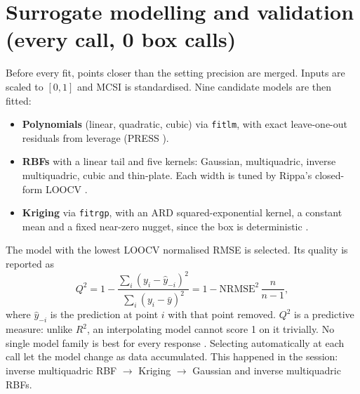 \documentclass[11pt,a4paper]{article}
\newcommand{\Qsq}{Q^2}
\begin{document}
\section{Surrogate modelling and validation (every call, 0 box calls)}
Before every fit, points closer than the setting precision are merged.
Inputs are scaled to $[0,1]$ and MCSI is standardised.
Nine candidate models are then fitted:
\begin{itemize}
\setlength{\itemsep}{0pt}
\item \textbf{Polynomials} (linear, quadratic, cubic) via \texttt{fitlm}, with exact leave-one-out residuals from leverage (PRESS \cite{Allen1971}).
\item \textbf{RBFs} with a linear tail and five kernels: Gaussian, multiquadric, inverse multiquadric, cubic and thin-plate. Each width is tuned by Rippa's closed-form LOOCV \cite{Rippa1999}.
\item \textbf{Kriging} via \texttt{fitrgp}, with an ARD squared-exponential kernel, a constant mean and a fixed near-zero nugget, since the box is deterministic \cite{Sacks1989,Rasmussen2006}.
\end{itemize}
The model with the lowest LOOCV normalised RMSE is selected.
Its quality is reported as
\begin{equation}
\Qsq = 1-\frac{\sum_i \left(y_i-\hat y_{-i}\right)^2}{\sum_i \left(y_i-\bar y\right)^2}
     = 1-\text{NRMSE}^2\,\frac{n}{n-1},
\end{equation}
where $\hat y_{-i}$ is the prediction at point $i$ with that point removed.
$\Qsq$ is a predictive measure: unlike $R^2$, an interpolating model cannot score 1 on it trivially.
No single model family is best for every response \cite{Forrester2008}.
Selecting automatically at each call let the model change as data accumulated.
This happened in the session: inverse multiquadric RBF $\rightarrow$ Kriging $\rightarrow$ Gaussian and inverse multiquadric RBFs.

\end{document}

